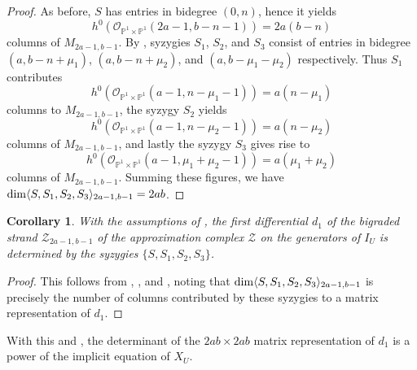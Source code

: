 \documentclass[reqno]{amsart}
\newtheorem{cor}[thm]{Corollary}
\numberwithin{equation}{section}
\theoremstyle{definition}
\def\O{\mathcal{O}}
\def\P{\mathbb{P}}
\def\Z{\mathcal{Z}}
\def\dim{\mathop{\rm dim}}
\begin{document}
\begin{proof}
As before, $S$ has entries in bidegree $(0,n)$, hence it yields
$$h^0(\O_{\P^1\times \P^1}(2a-1,b-n-1)) = 2a(b-n)$$
columns of $M_{2a-1,b-1}$. By , syzygies $S_1$, $S_2$, and $S_3$ consist of entries in bidegree $(a,b-n+\mu_1)$, $(a,b-n+\mu_2)$, and $(a,b-\mu_1-\mu_2)$ respectively. Thus $S_1$ contributes
$$h^0(\O_{\P^1\times \P^1}(a-1,n-\mu_1-1))=a(n-\mu_1)$$
columns to $M_{2a-1,b-1}$, the syzygy $S_2$ yields
$$h^0(\O_{\P^1\times \P^1}(a-1,n-\mu_2-1))= a(n-\mu_2)$$
columns of $M_{2a-1,b-1}$, and lastly the syzygy $S_3$ gives rise to
$$h^0(\O_{\P^1\times \P^1}(a-1,\mu_1+\mu_2-1)) = a(\mu_1+\mu_2)$$
columns of $M_{2a-1,b-1}$. Summing these figures, we have $\dim \langle S,S_1,S_2,S_3\rangle_{2a-1,b-1} = 2ab$.
\end{proof}


\begin{cor}
With the assumptions of , the first differential $d_1$ of the bigraded strand $\Z_{2a-1,b-1}$ of the approximation complex $\Z$ on the generators of $I_U$ is determined by the syzygies $\{S,S_1,S_2,S_3\}$. 
\end{cor}

\begin{proof}
This follows from , , and , noting that $\dim \langle S,S_1,S_2,S_3\rangle_{2a-1,b-1}$ is precisely the number of columns contributed by these syzygies to a matrix representation of $d_1$.
\end{proof}



With this and , the determinant of the $2ab\times 2ab$ matrix representation of $d_1$ is a power of the implicit equation of $X_U$. 
\end{document}
